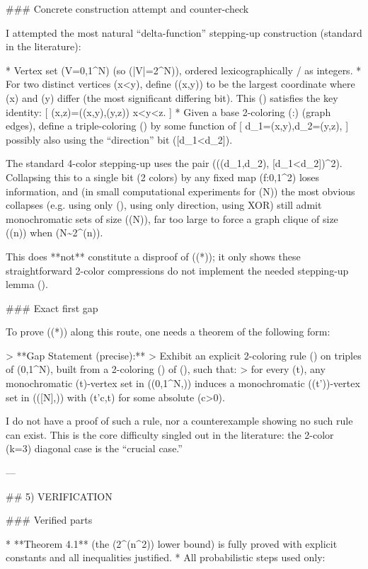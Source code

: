 ### Concrete construction attempt and counter-check

I attempted the most natural “delta-function” stepping-up construction (standard in the literature):

* Vertex set (V={0,1}^N) (so (|V|=2^N)), ordered lexicographically / as integers.
* For two distinct vertices (x<y), define (\delta(x,y)\in[N]) to be the largest coordinate where (x) and (y) differ (the most significant differing bit). This (\delta) satisfies the key identity:
  [
  \delta(x,z)=\max(\delta(x,y),\delta(y,z)) \quad {} x<y<z.
  ]
* Given a base 2-coloring (\phi:) (graph edges), define a triple-coloring (\chi) by some function of
  [
  d_1=\delta(x,y),\qquad d_2=\delta(y,z),
  ]
  possibly also using the “direction” bit ([d_1<d_2]).

The standard 4-color stepping-up uses the pair ((\phi({d_1,d_2}), [d_1<d_2])^2). Collapsing this to a single bit (2 colors) by any fixed map (f:{0,1}^2) loses information, and (in small computational experiments for (N)) the most obvious collapses (e.g. using only (\phi), using only direction, using XOR) still admit monochromatic sets of size (\Theta(N)), far too large to force a graph clique of size (\Theta(n)) when (N\sim 2^{\Theta(n)}).

This does **not** constitute a disproof of ((*)); it only shows these straightforward 2-color compressions do not implement the needed stepping-up lemma ().

### Exact first gap

To prove ((*)) along this route, one needs a theorem of the following form:

> **Gap Statement (precise):**
> Exhibit an explicit 2-coloring rule (\chi) on triples of ({0,1}^N), built from a 2-coloring (\phi) of (), such that:
> for every (t), any monochromatic (t)-vertex set in (({0,1}^N,\chi)) induces a monochromatic ((t'))-vertex set in (([N],\phi)) with (t'\ge c,t) for some absolute (c>0).

I do not have a proof of such a rule, nor a counterexample showing no such rule can exist. This is the core difficulty singled out in the literature: the 2-color (k=3) diagonal case is the “crucial case.” 

---

## 5) VERIFICATION

### Verified parts

* **Theorem 4.1** (the (2^{\Omega(n^2)}) lower bound) is fully proved with explicit constants and all inequalities justified.
* All probabilistic steps used only:

